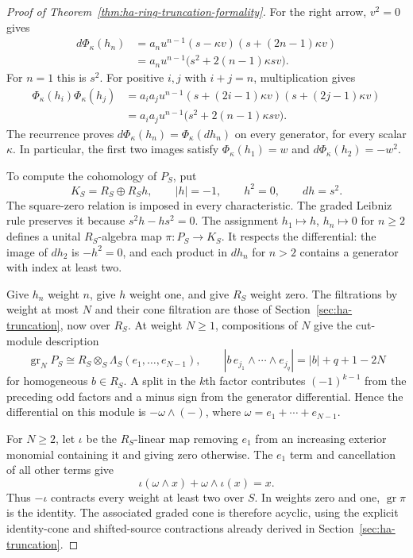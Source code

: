 \begin{proof}[Proof of Theorem~\ref{thm:ha-ring-truncation-formality}]
For the right arrow, $v^2=0$ gives
\[
 \begin{split}
 d\Phi_\kappa(h_n)
 &=a_nu^{n-1}(s-\kappa v)(s+(2n-1)\kappa v)\\
 &=a_nu^{n-1}\bigl(s^2+2(n-1)\kappa sv\bigr).
 \end{split}
\]
For $n=1$ this is $s^2$.
For positive $i,j$ with $i+j=n$, multiplication gives
\[
 \begin{split}
 \Phi_\kappa(h_i)\Phi_\kappa(h_j)
 &=a_ia_j u^{n-1}
   (s+(2i-1)\kappa v)(s+(2j-1)\kappa v)\\
 &=a_ia_j u^{n-1}\bigl(s^2+2(n-1)\kappa sv\bigr).
 \end{split}
\]
The recurrence proves $d\Phi_\kappa(h_n)=\Phi_\kappa(dh_n)$
on every generator, for every scalar $\kappa$.
In particular, the first two images satisfy
$\Phi_\kappa(h_1)=w$ and $d\Phi_\kappa(h_2)=-w^2$.

To compute the cohomology of $P_S$, put
\[
 K_S=R_S\oplus R_Sh,\qquad |h|=-1,\qquad h^2=0,\qquad dh=s^2.
\]
The square-zero relation is imposed in every characteristic.
The graded Leibniz rule preserves it because $s^2h-hs^2=0$.
The assignment $h_1\mapsto h$, $h_n\mapsto0$ for $n\geq2$
defines a unital $R_S$-algebra map $\pi:P_S\to K_S$.
It respects the differential: the image of $dh_2$ is $-h^2=0$,
and each product in $dh_n$ for $n>2$ contains a generator with index
at least two.

Give $h_n$ weight $n$, give $h$ weight one, and give $R_S$ weight zero.
The filtrations by weight at most $N$ and their cone filtration
are those of Section~\ref{sec:ha-truncation}, now over $R_S$.
At weight $N\geq1$, compositions of $N$ give the cut-module description
\[
 \operatorname{gr}_NP_S
 \cong R_S\otimes_S\Lambda_S(e_1,\ldots,e_{N-1}),
 \qquad |b\,e_{j_1}\wedge\cdots\wedge e_{j_q}|=|b|+q+1-2N
\]
for homogeneous $b\in R_S$.
A split in the $k$th factor contributes $(-1)^{k-1}$ from the
preceding odd factors and a minus sign from the generator differential.
Hence the differential on this module is $-\omega\wedge(-)$,
where $\omega=e_1+\cdots+e_{N-1}$.

For $N\geq2$, let $\iota$ be the $R_S$-linear map removing $e_1$
from an increasing exterior monomial containing it and giving zero otherwise.
The $e_1$ term and cancellation of all other terms give
\[
 \iota(\omega\wedge x)+\omega\wedge\iota(x)=x.
\]
Thus $-\iota$ contracts every weight at least two over $S$.
In weights zero and one, $\operatorname{gr}\pi$ is the identity.
The associated graded cone is therefore acyclic, using the explicit
identity-cone and shifted-source contractions already derived in
Section~\ref{sec:ha-truncation}.


\end{proof}
